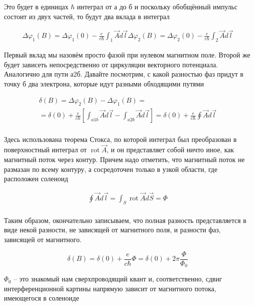 \documentclass[a4paper, 14pt]{article}
\begin{document}
    Это будет в единицах $\hbar$ интеграл от а до б и поскольку обобщённый импульс состоит из двух частей, то будут два
    вклада в интеграл
    
    \begin{gather}
        \Delta \varphi_1(B) = \Delta \varphi_1(0) - \frac{e}{c \hbar} \int_1 \vec{A} d \vec{l}
        \Delta \varphi_2(B) = \Delta \varphi_2(0) - \frac{e}{c \hbar} \int_2 \vec{A} d \vec{l}
    \end{gather}
    
    Первый вклад мы назовём просто фазой при нулевом магнитном поле.
    Второй же будет зависеть непосредственно от циркуляции векторного потенциала.
    Аналогично для пути а2б.
    Давайте посмотрим, с какой разностью фаз придут в точку б два электрона, которые идут разными обходящими путями
    
    \begin{gather}
        \delta(B) = \Delta \varphi_2(B) - \Delta \varphi_1(B) = \\
        = \delta(0) + \frac{e}{c \hbar}\left[\int_{a1b} \vec{A} d \vec{l} - \int_{a2b} \vec{A} d \vec{l} \right] =
        \delta(0) + \frac{e}{c \hbar} \oint \vec{A} d \vec{l} \\
    \end{gather}
    
    Здесь использована теорема Стокса, по которой интеграл был преобразован в поверхностный интеграл от
    $\operatorname{rot} \vec{A}$, и он представляет собой ничто иное, как магнитный поток через контур.
    Причем надо отметить, что магнитный поток не размазан по всему контуру, а сосредоточен только в узкой области,
    где расположен соленоид
    
    \begin{gather}
        \oint \vec{A} d \vec{l} = \int_S \operatorname{rot} \vec{A} d \vec{S} = \Phi \\
    \end{gather}
    
    Таким образом, окончательно записываем, что полная разность представляется в виде некой разности, не зависящей
    от магнитного поля, и разности фаз, зависящей от магнитного.
    
    \[ \delta(B) = \delta(0) + \frac{e}{c \hbar} \Phi = \delta(0) + 2 \pi \frac{\Phi}{\Phi_0} \]
    
    $\Phi_0$ -- это знакомый нам сверхпроводящий квант и, соответственно, сдвиг интерференционной картины напрямую
    зависит от магнитного потока, имеющегося в соленоиде
    
\end{document}
